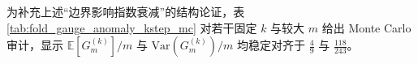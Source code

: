 \begin{remark}\label{rem:fold-gauge-anomaly-kstep-mc}
为补充上述“边界影响指数衰减”的结构论证，表 \ref{tab:fold_gauge_anomaly_kstep_mc} 对若干固定 \(k\) 与较大 \(m\) 给出 Monte Carlo 审计，显示 \(\mathbb E[G_m^{(k)}]/m\) 与 \(\mathrm{Var}(G_m^{(k)})/m\) 均稳定对齐于 \(\frac49\) 与 \(\frac{118}{243}\)。
\end{remark}


